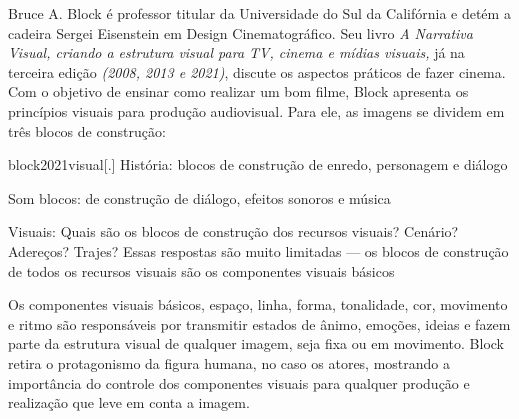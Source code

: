 Bruce A. Block é professor titular da Universidade do Sul da Califórnia
e detém a cadeira Sergei Eisenstein em Design Cinematográfico. Seu
livro \emph{A Narrativa Visual, criando a estrutura visual para TV,
	cinema e mídias visuais,} já na terceira edição \emph{(2008, 2013 e
	2021)}, discute os aspectos práticos de fazer cinema. Com o objetivo de
ensinar como realizar um bom filme, Block apresenta os princípios
visuais para produção audiovisual. Para ele, as imagens se dividem em
três blocos de construção:

\begin{displaycquote}[2]{block2021visual}[.]
	História: blocos de construção de enredo, personagem e diálogo

	Som blocos: de construção de diálogo, efeitos sonoros e música

	Visuais: Quais são os blocos de construção dos recursos visuais?
	Cenário? Adereços? Trajes? Essas respostas são muito limitadas --- os
	blocos de construção de todos os recursos visuais são os componentes
	visuais básicos
\end{displaycquote}

Os componentes visuais básicos, espaço, linha, forma, tonalidade, cor,
movimento e ritmo são responsáveis por transmitir estados de ânimo,
emoções, ideias e fazem parte da estrutura visual de qualquer imagem,
seja fixa ou em movimento. Block retira o protagonismo da figura
humana, no caso os atores, mostrando a importância do controle dos
componentes visuais para qualquer produção e realização que leve em
conta a imagem.

